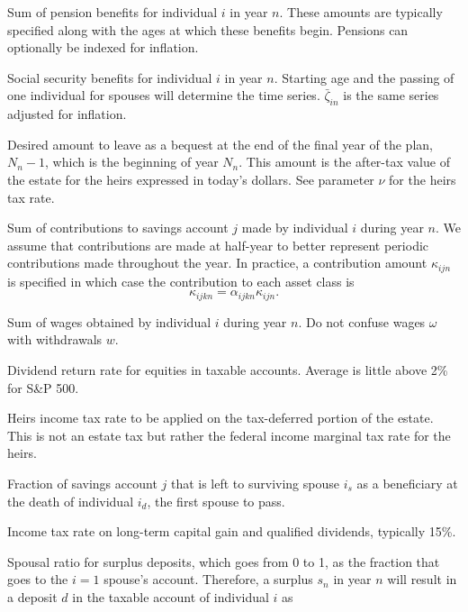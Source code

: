 \documentclass{report}[fleqn,12pt]
\begin{document}
\begin{description}[leftmargin=4em,style=multiline]
\item [$\pi_{in}$]
	Sum of pension benefits for individual $i$ in year $n$. These amounts are typically
	specified along with the ages at which these benefits begin.
	Pensions can optionally be indexed for inflation.
\item [$\zeta_{in}$]
	Social security benefits for individual $i$ in year $n$. Starting age and the passing
	of one individual for spouses will determine the time series. $\bar{\zeta}_{in}$ is
	the same series adjusted for inflation.
\item [$\epsilon_{N_n}$]
	Desired amount to leave as a bequest at the end of the final year of the plan, $N_n-1$,
	which is the beginning of year $N_n$. This amount is the after-tax value of the estate
	for the heirs expressed in today's dollars. See parameter $\nu$ for the heirs tax rate.
\item [$\kappa_{ijn}$]
	Sum of contributions to savings account $j$ made by individual $i$ during year $n$.
	We assume that contributions are made at half-year to better represent periodic
        contributions made throughout the year.
	In practice, a contribution
	amount $\kappa_{ijn}$ is specified in which case the contribution to each asset
	class is
	\begin{equation}
		\kappa_{ijkn} = \alpha_{ijkn}\kappa_{ijn}.
	\end{equation}
\item [$\omega_{in}$]
	Sum of wages obtained by individual $i$ during year $n$.
	Do not confuse wages $\omega$ with withdrawals $w$.
\item [$\mu$]
	Dividend return rate for equities in taxable accounts. Average is little above 2\% for S\&P 500.
\item [$\nu$]
	Heirs income tax rate to be applied on the tax-deferred portion of the estate. This is not an estate tax
	but rather the federal income marginal tax rate for the heirs.
\item [$\phi_j$]
	Fraction of savings account $j$ that is left to surviving spouse $i_s$ as a beneficiary
	at the death of individual $i_d$, the first spouse to pass.
\item [$\psi$]
	Income tax rate on long-term capital gain and qualified dividends, typically 15\%.
\item [$\eta$]
	Spousal ratio for surplus deposits, which goes from 0 to 1, as the fraction
	that goes to the $i = 1$ spouse's account. Therefore, a surplus $s_n$ in year $n$
	will result in a deposit $d$ in the taxable account of individual $i$ as

\end{description}
\end{document}
